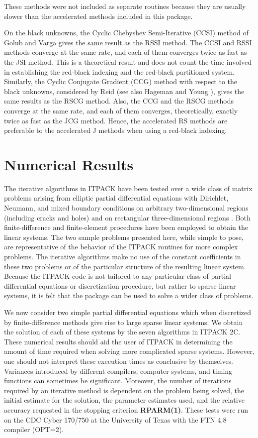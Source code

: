 \noindent 
These methods were not included as separate routines because they are
usually slower than the accelerated methods included in this package.
 
On the black unknowns, the Cyclic Chebyshev Semi-Iterative (CCSI)
method of Golub and Varga \cite{2} gives the same result as the RSSI 
method.  The CCSI and RSSI methods converge at the same rate, and each 
of them converges twice as fast as the JSI method.  This is a theoretical 
result \cite{6} and does not count the time involved in establishing 
the red-black indexing and the red-black partitioned system.  Similarly, 
the Cyclic Conjugate Gradient (CCG) method with respect to the black 
unknowns, considered by Reid \cite{16} (see also Hageman and Young 
\cite{6}), gives the same results as the RSCG method.  Also, the CCG and 
the RSCG methods converge at the same rate, and each of them converges, 
theoretically, exactly twice as fast as the JCG method.  Hence, the 
accelerated RS methods are preferable to the accelerated J methods 
when using a red-black indexing.
 
\section{Numerical Results}
\label{results}
 
The iterative algorithms in ITPACK have been tested over a wide class
of matrix problems arising from elliptic partial differential equations
with Dirichlet, Neumann, and mixed boundary conditions on arbitrary
two-dimensional regions (including cracks and holes) and on rectangular
three-dimensional regions \cite{1}.  Both finite-difference and 
finite-element procedures have been employed to obtain the linear systems.
The two sample problems presented here, while simple to pose, are
representative of the behavior of the ITPACK routines for more complex
problems.  The iterative algorithms make no use of the constant
coefficients in these two problems or of the particular structure of the
resulting linear system.  Because the ITPACK code is not tailored to any
particular class of partial differential equations or discretization
procedure, but rather to sparse linear systems, it is felt that the
package can be used to solve a wider class of problems.
 
We now consider two simple partial differential equations which when
discretized by finite-difference methods give rise to large sparse
linear systems.  We obtain the solution of each of these systems by the
seven algorithms in ITPACK 2C.  These numerical results should aid the
user of ITPACK in determining the amount of time required when solving
more complicated sparse systems.  However, one should not interpret
these execution times as conclusive by themselves.  Variances introduced
by different compilers, computer systems, and timing functions can
sometimes be significant.  Moreover, the number of iterations required
by an iterative method is dependent on the problem being solved, the
initial estimate for the solution, the parameter estimates used, and the
relative accuracy requested in the stopping criterion {\bf RPARM(1)}.
These tests were run on the CDC Cyber 170/750 at the University of Texas 
with the FTN 4.8 compiler (OPT=2).
 
